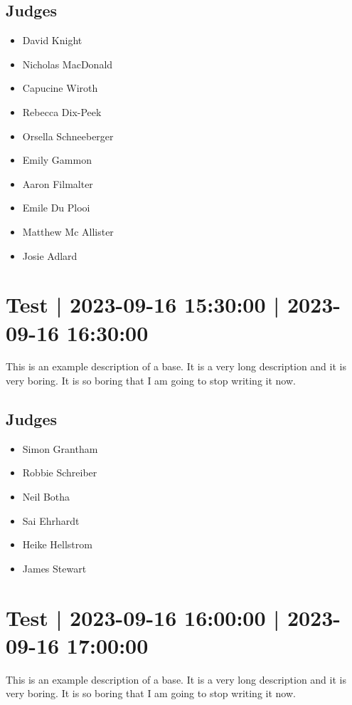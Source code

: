 \documentclass[10pt]{article}
\begin{document}
	\subsection*{Judges}
	\begin{itemize}

			\item David Knight
			\item Nicholas MacDonald
			\item Capucine Wiroth
			\item Rebecca Dix-Peek
			\item Orsella Schneeberger
			\item Emily Gammon
			\item Aaron Filmalter
			\item Emile Du Plooi
			\item Matthew Mc Allister
			\item Josie Adlard
		\end{itemize}

			\setcounter{section}{12}
	\section{Test | 2023-09-16 15:30:00 | 2023-09-16 16:30:00}
	This is an example description of a base. It is a very long description and it is very boring. It is so boring that I am going to stop writing it now.

	\subsection*{Judges}
	\begin{itemize}

			\item Simon Grantham
			\item Robbie Schreiber
			\item Neil Botha
			\item Sai Ehrhardt
			\item Heike Hellstrom
			\item James Stewart
		\end{itemize}

			\setcounter{section}{13}
	\section{Test | 2023-09-16 16:00:00 | 2023-09-16 17:00:00}
	This is an example description of a base. It is a very long description and it is very boring. It is so boring that I am going to stop writing it now.
\end{document}
